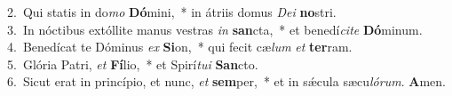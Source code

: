 {2.~}Qui statis in do\textit{mo} \textbf{Dó}mini,~* in átriis domus \textit{De}\textit{i} \textbf{no}stri.\\
{3.~}In nóctibus extóllite manus vestras \textit{in} \textbf{san}cta,~* et benedí\textit{ci}\textit{te} \textbf{Dó}minum.\\
{4.~}Benedícat te Dóminus \textit{ex} \textbf{Si}on,~* qui fecit cæ\textit{lum} \textit{et} \textbf{ter}ram.\\
{5.~}Glória Patri, \textit{et} \textbf{Fí}lio,~* et Spirí\textit{tu}\textit{i} \textbf{San}cto.\\
{6.~}Sicut erat in princípio, et nunc, \textit{et} \textbf{sem}per,~* et in sǽcula sæcu\textit{ló}\textit{rum}. \textbf{A}men.\\
